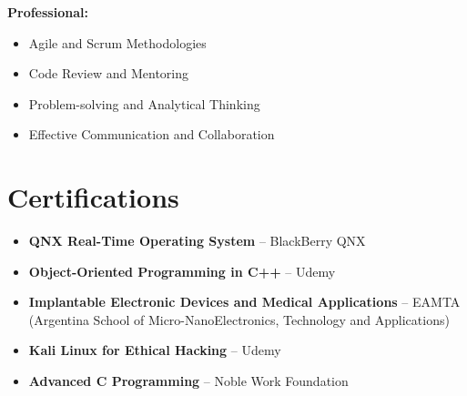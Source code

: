 \documentclass[11pt,a4paper]{article}
\begin{document}
\noindent\textbf{Professional:}
\begin{itemize}[leftmargin=*, nosep, topsep=2pt]
    \item Agile and Scrum Methodologies
    \item Code Review and Mentoring
    \item Problem-solving and Analytical Thinking
    \item Effective Communication and Collaboration
\end{itemize}

\section{Certifications}

\begin{itemize}[leftmargin=*, nosep, topsep=2pt]
    \item \textbf{QNX Real-Time Operating System} -- BlackBerry QNX
    \item \textbf{Object-Oriented Programming in C++} -- Udemy
    \item \textbf{Implantable Electronic Devices and Medical Applications} -- EAMTA (Argentina School of Micro-NanoElectronics, Technology and Applications)
    \item \textbf{Kali Linux for Ethical Hacking} -- Udemy
    \item \textbf{Advanced C Programming} -- Noble Work Foundation
\end{itemize}
\end{document}
